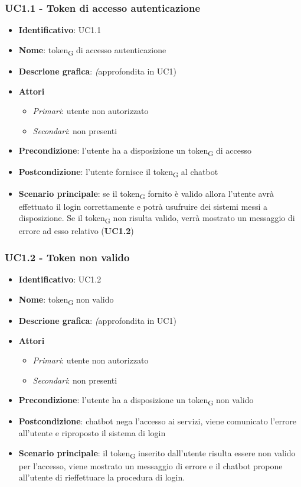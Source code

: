 \subsubsection{UC1.1 - Token di accesso autenticazione}
\begin{itemize}
    \item \textbf{Identificativo}: UC1.1
    \item \textbf{Nome}: token\textsubscript{G} di accesso autenticazione
    \item \textbf{Descrione grafica}: \textit(approfondita in UC1)
    \item \textbf{Attori}
 \begin{itemize} 
    \item \textit{Primari}: utente non autorizzato
    \item \textit{Secondari}: non presenti
 \end{itemize}
 \item \textbf{Precondizione}: l'utente ha a disposizione un token\textsubscript{G} di accesso
 \item \textbf{Postcondizione}: l'utente fornisce il token\textsubscript{G} al chatbot 
 \item \textbf{Scenario principale}: se il token\textsubscript{G} fornito è valido allora l'utente avrà effettuato il login correttamente e potrà usufruire dei sistemi messi a disposizione. Se il token\textsubscript{G} non risulta valido, verrà mostrato un messaggio di errore ad esso relativo (\textbf{UC1.2})
\end{itemize}

\subsubsection{UC1.2 - Token non valido}
\begin{itemize}
    \item \textbf{Identificativo}: UC1.2
    \item \textbf{Nome}: token\textsubscript{G} non valido
    \item \textbf{Descrione grafica}: \textit(approfondita in UC1)
    \item \textbf{Attori}
 \begin{itemize} 
    \item \textit{Primari}: utente non autorizzato 
    \item \textit{Secondari}: non presenti
 \end{itemize}
 \item \textbf{Precondizione}: l'utente ha a disposizione un token\textsubscript{G} non valido
 \item \textbf{Postcondizione}: chatbot nega l'accesso ai servizi, viene comunicato l'errore all'utente e riproposto il sistema di login 
 \item \textbf{Scenario principale}: il token\textsubscript{G} inserito dall'utente risulta essere non valido per l'accesso, viene mostrato un messaggio di errore e il chatbot propone all'utente di rieffettuare la procedura di login.
\end{itemize}
\newpage